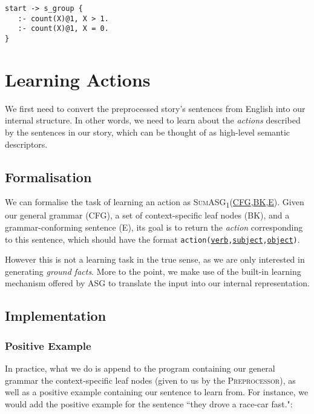 \begin{displayquote}
\begin{lstlisting}
start -> s_group {
   :- count(X)@1, X > 1.
   :- count(X)@1, X = 0.
}
\end{lstlisting}
\end{displayquote}

\section{Learning Actions}
\label{sec:learn_actions}

We first need to convert the preprocessed story's sentences from English into our internal structure. In other words, we need to learn about the \textit{actions} described by the sentences in our story, which can be thought of as high-level semantic descriptors.

\subsection{Formalisation}

We can formalise the task of learning an action as \textsc{SumASG\textsubscript{1}(\underline{CFG},\underline{BK},\underline{E})}. Given our general grammar (\textsc{CFG}), a set of context-specific leaf nodes (\textsc{BK}), and a grammar-conforming sentence (\textsc{E}), its goal is to return the \textit{action} corresponding to this sentence, which should have the format \texttt{action(\underline{verb},\underline{subject},\underline{object})}.

However this is not a learning task in the true sense, as we are only interested in generating \textit{ground facts}. More to the point, we make use of the built-in learning mechanism offered by ASG to translate the input into our internal representation.

\subsection{Implementation}

\subsubsection{Positive Example}

In practice, what we do is append to the program containing our general grammar the context-specific leaf nodes (given to us by the \textsc{Preprocessor}), as well as a positive example containing our sentence to learn from. For instance, we would add the positive example for the sentence ``they drove a race-car fast.":

